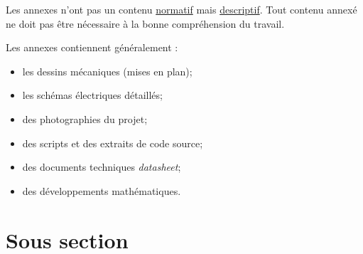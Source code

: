\documentclass[
    reds, %
    il, %
]{heig-tb}
\begin{document}
Les annexes n'ont pas un contenu \underline{normatif} mais \underline{descriptif}. Tout contenu annexé ne doit pas être nécessaire à la bonne compréhension du travail.

Les annexes contiennent généralement :

\begin{itemize}
    \item les dessins mécaniques (mises en plan);
    \item les schémas électriques détaillés;
    \item des photographies du projet;
    \item des scripts et des extraits de code source;
    \item des documents techniques \pex \emph{datasheet};
    \item des développements mathématiques.
\end{itemize}
\section{Sous section}
\lipsum[1]

\let\cleardoublepage\clearpage
\backmatter

\label{glossaire}
\printnoidxglossary
\label{index}
\printindex


\end{document}
